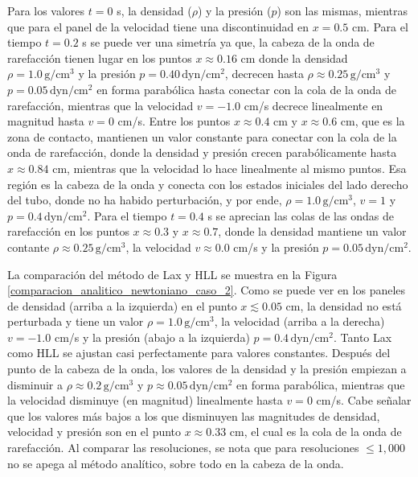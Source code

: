 \documentclass[12pt,a4paper]{book}
\begin{document}
Para los valores $t = 0$ s, la densidad ($\rho$) y la presión ($p$) son las mismas, 
mientras que para el panel de
la velocidad  tiene una discontinuidad en $x = 0.5$ cm. 
Para el tiempo $t = 0.2$ s se puede ver una 
simetría ya que, la cabeza de la onda de rarefacción tienen lugar en los puntos $x \approx 0.16$ cm
donde la densidad $\rho = 1.0 \,  \text{g}/ \text{cm}^3$ y 
la presión $p = 0.40 \,  \text{dyn}/ \text{cm}^2 $,
decrecen hasta $\rho \approx 0.25 \,  \text{g}/ \text{cm}^3$ y $p = 0.05 \,  \text{dyn}/ \text{cm}^2 $ en forma parabólica hasta conectar con la cola de 
la onda de rarefacción, mientras que la velocidad $v = -1.0 $ cm/s decrece linealmente en magnitud 
hasta $v = 0$ cm/s. Entre los puntos $x \approx 0.4$ cm y $x \approx 0.6$ cm, que es la zona de contacto, mantienen
un valor constante para conectar con la cola de la onda de rarefacción, donde la densidad y presión 
crecen parabólicamente hasta $x \approx 0.84$ cm, mientras que la velocidad lo hace linealmente al mismo puntos.
Esa región es la cabeza de la onda y conecta con los estados iniciales del lado derecho del tubo, 
donde no ha habido perturbación, y por ende, $\rho = 1.0 \,  \text{g}/ \text{cm}^3$, 
$v = 1$ y $p = 0.4 \,  \text{dyn}/ \text{cm}^2 $.
Para el tiempo $t = 0.4$ s se aprecian las colas de las ondas de rarefacción
en los puntos $x  \approx 0.3$ y $x  \approx 0.7$, donde la densidad mantiene un valor contante 
$\rho \approx 0.25 \,  \text{g}/ \text{cm}^3$, la velocidad $v \approx 0.0$ cm/s y la presión $p = 0.05 \,  \text{dyn}/ \text{cm}^2 $.

La comparación del método de Lax y HLL se muestra en la Figura \ref{comparacion_analitico_newtoniano_caso_2}.
Como se puede ver en los paneles de densidad (arriba a la izquierda) en el punto $x \lesssim  0.05$ cm,
la densidad no está perturbada y tiene un valor $\rho = 1.0 \,  \text{g}/ \text{cm}^3$,
la velocidad (arriba a la derecha)
$v = -1.0$ cm/s y la presión (abajo a la izquierda) $p = 0.4 \,  \text{dyn}/ \text{cm}^2 $. Tanto Lax como HLL 
se ajustan casi perfectamente 
para valores constantes. Después del punto de la cabeza de la onda, los valores de la densidad y 
la presión empiezan a disminuir a $\rho \approx 0.2 \,  \text{g}/ \text{cm}^3$ y 
$p \approx 0.05 \,  \text{dyn}/ \text{cm}^2 $
en forma parabólica, mientras que la velocidad disminuye (en magnitud) linealmente hasta $v = 0$ cm/s.
Cabe señalar que los valores más bajos a los que disminuyen las magnitudes de densidad, velocidad y 
presión son en el punto $x \approx 0.33$ cm, el cual es la cola de la onda de rarefacción. Al comparar
las resoluciones, se nota que para resoluciones $\leq 1,000$ no se apega al método analítico, sobre 
todo en la cabeza de la onda.
\end{document}
